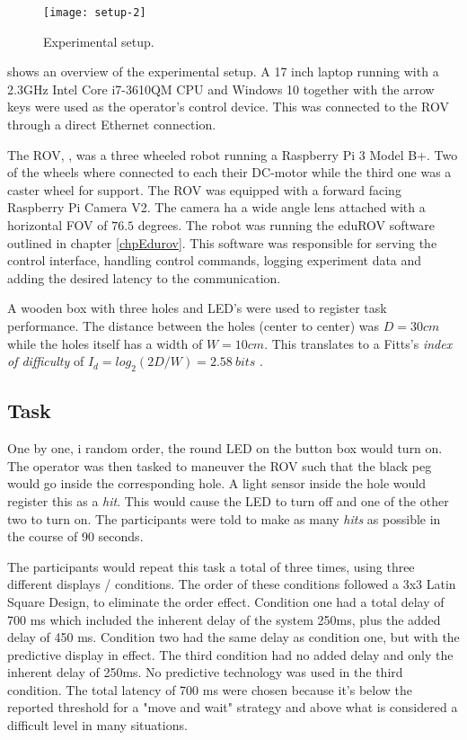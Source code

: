 \begin{figure}[h!]
    \centering
    \texttt{[image: setup-2]}
    \caption{Experimental setup.}
    \label{expsetup}
\end{figure}

 shows an overview of the experimental setup. A 17 inch laptop running with a 2.3GHz Intel Core i7-3610QM CPU and Windows 10 together with the arrow keys were used as the operator's control device. This was connected to the ROV through a direct Ethernet connection. 

The ROV, , was a three wheeled robot running a Raspberry Pi 3 Model B+. Two of the wheels where connected to each their DC-motor while the third one was a caster wheel for support. The ROV was equipped with a forward facing Raspberry Pi Camera V2. The camera ha a wide angle lens attached with a horizontal FOV of $76.5$ degrees. The robot was running the eduROV software outlined in chapter \ref{chpEdurov}. This software was responsible for serving the control interface, handling control commands, logging experiment data and adding the desired latency to the communication.

A wooden box with three holes and LED's were used to register task performance. The distance between the holes (center to center) was $D=30cm$ while the holes itself has a width of $W=10cm$. This translates to a Fitts's \emph{index of difficulty} of $I_d=log_2\left ( 2D/W \right )=2.58\: bits$ \citep{Fitts1954}.

\subsection{Task}\label{task}

One by one, i random order, the round LED on the button box would turn on. The operator was then tasked to maneuver the ROV such that the black peg would go inside the corresponding hole. A light sensor inside the hole would register this as a \emph{hit}. This would cause the LED to turn off and one of the other two to turn on. The participants were told to make as many \emph{hits} as possible in the course of 90 seconds.

The participants would repeat this task a total of three times, using three different displays / conditions. The order of these conditions followed a 3x3 Latin Square Design, to eliminate the order effect. Condition one had a total delay of 700 ms which included the inherent delay of the system 250ms, plus the added delay of 450 ms. Condition two had the same delay as condition one, but with the predictive display in effect. The third condition had no added delay and only the inherent delay of 250ms. No predictive technology was used in the third condition. The total latency of 700 ms were chosen because it's below the reported threshold for a "move and wait" strategy \citep{Chen2007} and above what is considered a difficult level in many situations.

